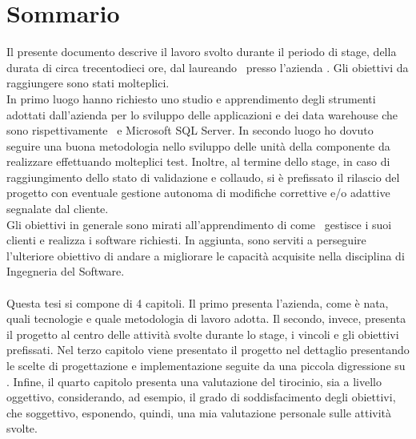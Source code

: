 
\cleardoublepage
{}
{}
\begingroup
\let\clearpage\relax
\let\cleardoublepage\relax
\let\cleardoublepage\relax

\chapter*{Sommario}

Il presente documento descrive il lavoro svolto durante il periodo di stage, della durata di circa trecentodieci ore, dal laureando \myName\ presso l'azienda \azienda .
Gli obiettivi da raggiungere sono stati molteplici.\\
In primo luogo hanno richiesto uno studio e apprendimento degli strumenti adottati dall'azienda per lo sviluppo delle applicazioni e dei data warehouse che sono rispettivamente \inde\ e  Microsoft SQL Server. In secondo luogo ho dovuto seguire una buona metodologia nello sviluppo delle unità della componente da realizzare effettuando molteplici test. Inoltre, al termine dello stage, in caso di raggiungimento dello stato di validazione e collaudo, si è prefissato il rilascio del progetto con eventuale gestione autonoma di modifiche correttive e/o adattive segnalate dal cliente.\\
Gli obiettivi in generale sono mirati all'apprendimento di come \azienda\ gestisce i suoi clienti e realizza i software richiesti. In aggiunta, sono serviti a perseguire l'ulteriore obiettivo di andare a migliorare le capacità acquisite nella disciplina di Ingegneria del Software.\\
\\
Questa tesi si compone di 4 capitoli. 
Il primo presenta l'azienda, come è nata, quali tecnologie e quale metodologia di lavoro adotta. Il secondo, invece, presenta il progetto al centro delle attività svolte durante lo stage, i vincoli e gli obiettivi prefissati. Nel terzo capitolo viene presentato il progetto nel dettaglio presentando le scelte di progettazione e implementazione seguite da una piccola digressione su \inde.
Infine, il quarto capitolo presenta una valutazione del tirocinio, sia a livello oggettivo, considerando, ad esempio, il grado di soddisfacimento degli obiettivi, che soggettivo, esponendo, quindi, una mia valutazione personale sulle attività svolte.


%
%

\endgroup			

\vfill

